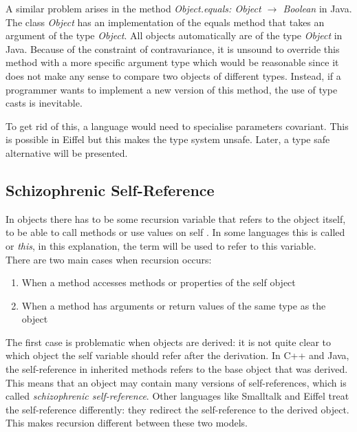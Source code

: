 A similar problem arises in the method \emph{Object.equals: Object
$\rightarrow$ Boolean} in Java. The class \emph{Object} has an
implementation of the equals method that takes an argument of the type
\emph{Object}. All objects automatically are of the type \emph{Object}
in Java.    Because of the constraint of contravariance, it is unsound
to override this method with a more specific argument type which would
be reasonable since it does not make any sense to compare two objects
of different types. Instead, if a programmer wants to implement a new
version of this method, the use of type casts is inevitable.

To get rid of this, a language would need to specialise parameters
covariant. This is possible in Eiffel but this makes the type system
unsafe. Later, a type safe alternative will be presented.

\subsection{Schizophrenic Self-Reference}
\label{sec:schizoReferences}


In objects there has to be some recursion variable that refers to the
object itself, to be able to call methods or use values on self . In some
languages this is called \self or \emph{this}, in this explanation,
the term \self will be used to refer to this variable. \\

There are two main cases when recursion occurs:
\begin{enumerate}
	\item When a method accesses methods or properties of the self object
	\item When a method has arguments or return values of the same type as the object
\end{enumerate}

The first case is problematic when objects are derived: it is not quite
clear to which object the self variable should refer after the derivation.
In C++ and Java, the self-reference in inherited methods refers to
the base object that was derived. This means that an object may contain
many versions of self-references, which is called \emph{schizophrenic
self-reference}. Other languages like Smalltalk and Eiffel treat the
self-reference differently: they redirect the self-reference to the
derived object. This makes recursion different between these two models.

